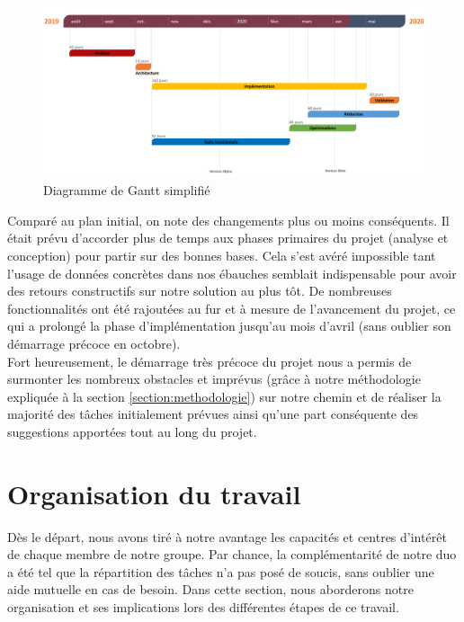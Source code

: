 \begin{figure}[H]
    \includegraphics[width=\textwidth,height=\textheight,keepaspectratio]{images/planning.png}
    \centering
    \caption{Diagramme de Gantt simplifié}
    \label{pic:ganttChart}
\end{figure}

Comparé au plan initial, on note des changements plus ou moins conséquents. Il était prévu d'accorder plus de temps aux phases primaires du projet (analyse et conception) pour partir sur des bonnes bases. Cela s'est avéré impossible tant l'usage de données concrètes dans nos ébauches semblait indispensable pour avoir des retours constructifs sur notre solution au plus tôt. De nombreuses fonctionnalités ont été rajoutées au fur et à mesure de l'avancement du projet, ce qui a prolongé la phase d'implémentation jusqu'au mois d'avril (sans oublier son démarrage précoce en octobre). \\

Fort heureusement, le démarrage très précoce du projet nous a permis de surmonter les nombreux obstacles et imprévus (grâce à notre méthodologie expliquée à la section \ref{section:methodologie}) sur notre chemin et de réaliser la majorité des tâches initialement prévues ainsi qu'une part conséquente des suggestions apportées tout au long du projet. \\


\section{Organisation du travail}

Dès le départ, nous avons tiré à notre avantage les capacités et centres d'intérêt de chaque membre de notre groupe. Par chance, la complémentarité de notre duo a été tel que la répartition des tâches n'a pas posé de soucis, sans oublier une aide mutuelle en cas de besoin. Dans cette section, nous aborderons notre organisation et ses implications lors des différentes étapes de ce travail.\\

